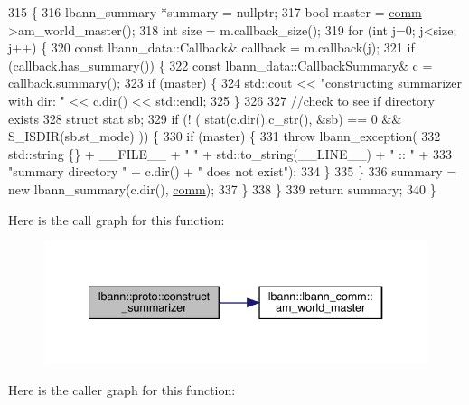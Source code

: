 \begin{DoxyCode}
315                                                               \{
316   lbann\_summary *summary = \textcolor{keyword}{nullptr};
317   \textcolor{keywordtype}{bool} master = \hyperlink{file__io_8cpp_ab048c6f9fcbcfaa57ce68b00263dbebe}{comm}->am\_world\_master();
318   \textcolor{keywordtype}{int} size = m.callback\_size();
319   \textcolor{keywordflow}{for} (\textcolor{keywordtype}{int} j=0; j<size; j++) \{
320     \textcolor{keyword}{const} lbann\_data::Callback& callback = m.callback(j);
321     \textcolor{keywordflow}{if} (callback.has\_summary()) \{
322       \textcolor{keyword}{const} lbann\_data::CallbackSummary& c = callback.summary();
323       \textcolor{keywordflow}{if} (master) \{
324         std::cout << \textcolor{stringliteral}{"constructing summarizer with dir: "} << c.dir() << std::endl;
325       \}
326 
327       \textcolor{comment}{//check to see if directory exists}
328       \textcolor{keyword}{struct }stat sb;
329       \textcolor{keywordflow}{if} (! ( stat(c.dir().c\_str(), &sb) == 0 && S\_ISDIR(sb.st\_mode) )) \{
330         \textcolor{keywordflow}{if} (master) \{
331           \textcolor{keywordflow}{throw} lbann\_exception(
332             std::string \{\} + \_\_FILE\_\_ + \textcolor{stringliteral}{" "} + std::to\_string(\_\_LINE\_\_) + \textcolor{stringliteral}{" :: "} +
333             \textcolor{stringliteral}{"summary directory "} + c.dir() + \textcolor{stringliteral}{" does not exist"});
334         \}
335       \}
336       summary = \textcolor{keyword}{new} lbann\_summary(c.dir(), \hyperlink{file__io_8cpp_ab048c6f9fcbcfaa57ce68b00263dbebe}{comm});
337     \}
338   \}
339   \textcolor{keywordflow}{return} summary;
340 \}
\end{DoxyCode}
Here is the call graph for this function\+:\nopagebreak
\begin{figure}[H]
\begin{center}
\leavevmode
\includegraphics[width=340pt]{namespacelbann_1_1proto_abf0988db9cd58f9ef013588b440c14bd_cgraph}
\end{center}
\end{figure}
Here is the caller graph for this function\+:\nopagebreak
